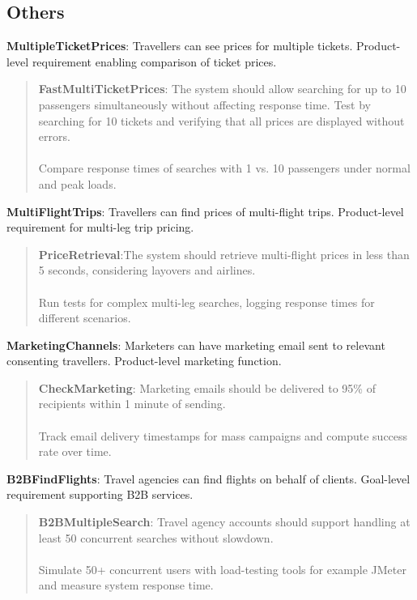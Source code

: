 \subsection{Others}
\textbf{MultipleTicketPrices}: Travellers can see prices for multiple tickets. Product-level requirement enabling comparison of ticket prices.
\begin{quote}
    \textbf{FastMultiTicketPrices}: The system should allow searching for up to 10 passengers simultaneously without affecting response time. Test by searching for 10 tickets and verifying that all prices are displayed without errors.\\ \\
     Compare response times of searches with 1 vs. 10 passengers under normal and peak loads.
\end{quote}
\textbf{MultiFlightTrips}: Travellers can find prices of multi-flight trips. Product-level requirement for multi-leg trip pricing. 
    \begin{quote}
        \textbf{PriceRetrieval}:The system should retrieve multi-flight prices in less than 5 seconds, considering layovers and airlines. \\ \\ 
        Run tests for complex multi-leg searches, logging response times for different scenarios.
    \end{quote}
\textbf{MarketingChannels}: Marketers can have marketing email sent to relevant consenting travellers. Product-level marketing function.
\begin{quote}
    \textbf{CheckMarketing}: Marketing emails should be delivered to 95\% of recipients within 1 minute of sending. \\ \\
    Track email delivery timestamps for mass campaigns and compute success rate over time.
\end{quote}
\textbf{B2BFindFlights}: Travel agencies can find flights on behalf of clients. Goal-level requirement supporting B2B services.
\begin{quote}
    \textbf{B2BMultipleSearch}: Travel agency accounts should support handling at least 50 concurrent searches without slowdown. \\ \\ 
Simulate 50+ concurrent users with load-testing tools for example JMeter and measure system response time.
\end{quote}

